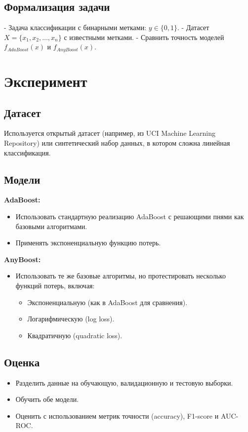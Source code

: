 \subsection*{Формализация задачи}

- Задача классификации с бинарными метками: $y \in \{0, 1\}$.
- Датасет $X = \{x_1, x_2, \ldots, x_n\}$ с известными метками.
- Сравнить точность моделей $f_{AdaBoost}(x)$ и $f_{AnyBoost}(x)$.

\section*{Эксперимент}

\subsection*{Датасет}
Используется открытый датасет (например, из UCI Machine Learning Repository) или синтетический набор данных, в котором сложна линейная классификация.

\subsection*{Модели}

\textbf{AdaBoost:}
\begin{itemize}
    \item Использовать стандартную реализацию AdaBoost с решающими пнями как базовыми алгоритмами.
    \item Применять экспоненциальную функцию потерь.
\end{itemize}

\textbf{AnyBoost:}
\begin{itemize}
    \item Использовать те же базовые алгоритмы, но протестировать несколько функций потерь, включая:
    \begin{itemize}
        \item Экспоненциальную (как в AdaBoost для сравнения).
        \item Логарифмическую (log loss).
        \item Квадратичную (quadratic loss).
    \end{itemize}
\end{itemize}

\subsection*{Оценка}
\begin{itemize}
    \item Разделить данные на обучающую, валидационную и тестовую выборки.
    \item Обучить обе модели.
    \item Оценить с использованием метрик точности (accuracy), F1-score и AUC-ROC.
\end{itemize}

